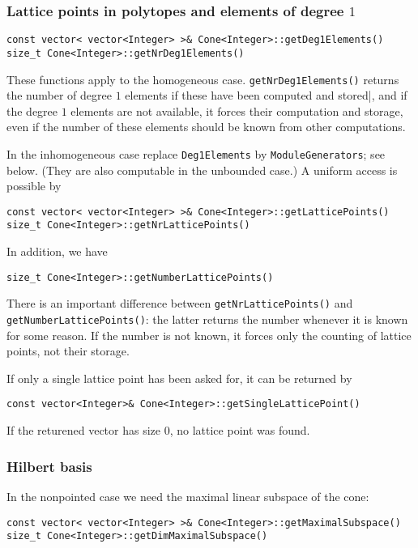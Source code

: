 \begin{small}
\subsubsection{Lattice points in polytopes and elements of degree $1$}

\begin{Verbatim}
const vector< vector<Integer> >& Cone<Integer>::getDeg1Elements()
size_t Cone<Integer>::getNrDeg1Elements()
\end{Verbatim}
These functions apply to the homogeneous case. \verb|getNrDeg1Elements()| returns the number of degree $1$ elements if these have been computed and stored|, and if the degree $1$ elements are not available, it forces their computation and storage, even if the number of these elements should be known from other computations.

In the inhomogeneous case replace \verb|Deg1Elements| by \verb|ModuleGenerators|; see below. (They are also computable in the unbounded case.) A uniform access is possible by
\begin{Verbatim}
const vector< vector<Integer> >& Cone<Integer>::getLatticePoints()
size_t Cone<Integer>::getNrLatticePoints()
\end{Verbatim}

In addition, we have
\begin{Verbatim}
size_t Cone<Integer>::getNumberLatticePoints()
\end{Verbatim}
There is an important difference between \verb|getNrLatticePoints()| and \verb|getNumberLatticePoints()|: the latter returns the number whenever it is known for some reason. If the number is not known, it forces only the counting of lattice points, not their storage.

If only a single lattice point has been asked for, it can be returned by 
\begin{Verbatim}
const vector<Integer>& Cone<Integer>::getSingleLatticePoint()
\end{Verbatim}
If the returened vector has size $0$, no lattice point was found.

\subsubsection{Hilbert basis}\label{HB_lib}

In the nonpointed case we need the maximal linear subspace of the cone:
\begin{Verbatim}
const vector< vector<Integer> >& Cone<Integer>::getMaximalSubspace()
size_t Cone<Integer>::getDimMaximalSubspace()
\end{Verbatim}


\end{small}
